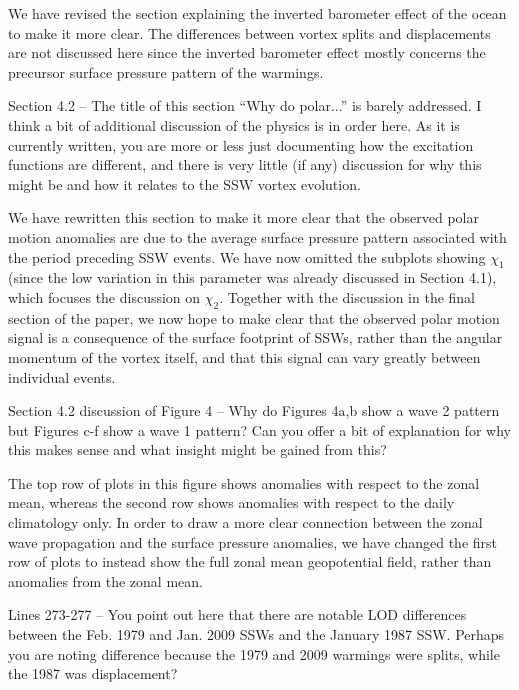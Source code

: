 \documentclass[a4paper,10pt]{article}
\begin{document}
We have revised the section explaining the inverted barometer effect of the ocean to make it more clear.  
The differences between vortex splits and displacements are not discussed here since the inverted barometer effect mostly concerns the precursor surface pressure pattern of the warmings. 
\vspace{0.5cm}

\textcolor{reviewer}{Section 4.2 – The title of this section “Why do polar...” is barely addressed. I think a bit
of additional discussion of the physics is in order here. As it is currently written, you are
more or less just documenting how the excitation functions are different, and there is very
little (if any) discussion for why this might be and how it relates to the SSW vortex
evolution.}
\vspace{0.5cm}

We have rewritten this section to make it more clear that the observed polar motion anomalies are due to the average surface pressure pattern associated with the period preceding SSW events. 
We have now omitted the subplots showing $\chi_1$ (since the low variation in this parameter was already discussed in Section 4.1), which focuses the discussion on $\chi_2$.   
Together with the discussion in the final section of the paper, we now hope to make clear that the observed polar motion signal is a consequence of the surface footprint of SSWs, rather than the angular momentum of the vortex itself, and that this signal can vary greatly between individual events.  
\vspace{0.5cm}


\textcolor{reviewer}{Section 4.2 discussion of Figure 4 – Why do Figures 4a,b show a wave 2 pattern but
Figures c-f show a wave 1 pattern? Can you offer a bit of explanation for why this makes
sense and what insight might be gained from this?}
\vspace{0.5cm}

The top row of plots in this figure shows anomalies with respect to the zonal mean, whereas the second row shows anomalies with respect to the daily climatology only.
In order to draw a more clear connection between the zonal wave propagation and the surface pressure anomalies, we have changed the first row of plots to instead show the full zonal mean geopotential field, rather than anomalies from the zonal mean.

\vspace{0.5cm}

\textcolor{reviewer}{Lines 273-277 – You point out here that there are notable LOD differences between the
Feb. 1979 and Jan. 2009 SSWs and the January 1987 SSW. Perhaps you are noting
difference because the 1979 and 2009 warmings were splits, while the 1987 was displacement?}
\vspace{0.5cm}
\end{document}
